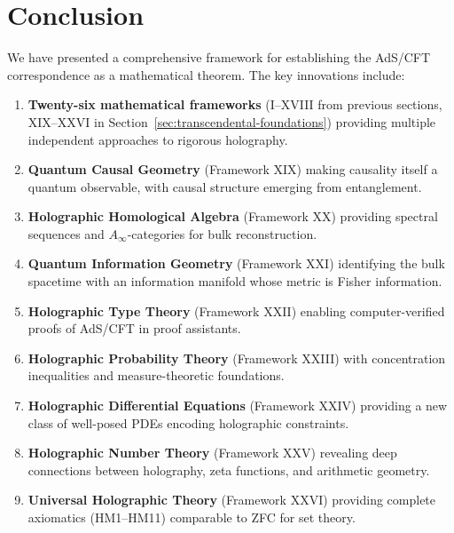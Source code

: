 \documentclass[12pt,a4paper]{article}
\begin{document}
\section{Conclusion}
\label{sec:conclusion}

We have presented a comprehensive framework for establishing the AdS/CFT correspondence as a mathematical theorem. The key innovations include:

\begin{enumerate}
    \item \textbf{Twenty-six mathematical frameworks} (I--XVIII from previous sections, XIX--XXVI in Section~\ref{sec:transcendental-foundations}) providing multiple independent approaches to rigorous holography.
    
    \item \textbf{Quantum Causal Geometry} (Framework XIX) making causality itself a quantum observable, with causal structure emerging from entanglement.
    
    \item \textbf{Holographic Homological Algebra} (Framework XX) providing spectral sequences and $A_\infty$-categories for bulk reconstruction.
    
    \item \textbf{Quantum Information Geometry} (Framework XXI) identifying the bulk spacetime with an information manifold whose metric is Fisher information.
    
    \item \textbf{Holographic Type Theory} (Framework XXII) enabling computer-verified proofs of AdS/CFT in proof assistants.
    
    \item \textbf{Holographic Probability Theory} (Framework XXIII) with concentration inequalities and measure-theoretic foundations.
    
    \item \textbf{Holographic Differential Equations} (Framework XXIV) providing a new class of well-posed PDEs encoding holographic constraints.
    
    \item \textbf{Holographic Number Theory} (Framework XXV) revealing deep connections between holography, zeta functions, and arithmetic geometry.
    
    \item \textbf{Universal Holographic Theory} (Framework XXVI) providing complete axiomatics (HM1--HM11) comparable to ZFC for set theory.
\end{enumerate}
\end{document}
